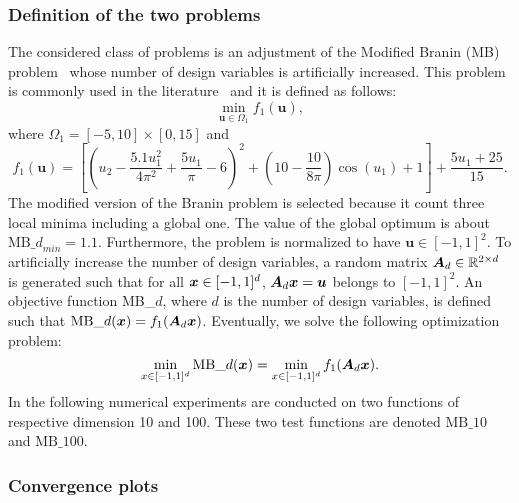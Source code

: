 \subsubsection{Definition of the two problems}

The considered class of problems is an adjustment of the Modified Branin (MB) problem~\cite{ParrInfillsamplingcriteria2012} whose number of design variables is artificially increased.
This problem is commonly used in the literature~\cite{binoisChoiceLowdimensionalDomain2020,WangBayesianoptimizationbillion2016,nayebiFrameworkBayesianOptimization2019} and it is  defined as follows:
\begin{equation}
    \min_{\bm{u} \in \Omega_1}{f_1(\bm{u})},
\end{equation}
where $\Omega_1 = [-5,10] \times [0,15]$ and
\begin{equation}
    f_1(\bm{u}) = \left[ \left( u_2 - \frac{5.1u_1^2}{4\pi^2} + \frac{5u_1}{\pi} - 6 \right)^2 +\left( 10 - \frac{10}{8\pi} \right) \cos{(u_1) + 1} \right] + \frac{5u_1 + 25}{15}.
\end{equation}
The modified version of the Branin problem is selected because it count three local minima including a global one.
The value of the global optimum is about ${\text{MB\_$d$}}_{min} = 1.1$.
Furthermore, the problem is normalized to have $\bm{u} \in [-1,1]^2$.
To artificially increase the number of design variables, a random matrix $\bm{A}_d \in \mathbb{R}^{2 \times d}$ is generated such that for all $\bm{x} \in [-1,1]^d$, $\bm{A}_d \bm{x} = \bm{u}$ belongs to $[-1,1]^2$.
An objective function MB\_$d$, where $d$ is the number of design variables, is defined such that $\text{MB\_$d$}(\bm{x}) = f_1(\bm{A}_d\bm{x})$.
Eventually, we solve the following optimization problem:
\begin{equation}
    \min\limits_{x \in [-1,1]^d} \text{MB\_$d$}(\bm{x}) = \min\limits_{x \in [-1,1]^d} f_1(\bm{A}_d\bm{x}).
\end{equation}
In the following numerical experiments are conducted on two functions of respective dimension 10 and 100. These two test functions are denoted $\text{MB\_$10$}$ and $\text{MB\_$100$}$.

\subsubsection{Convergence plots}
\label{sssec:conv}

